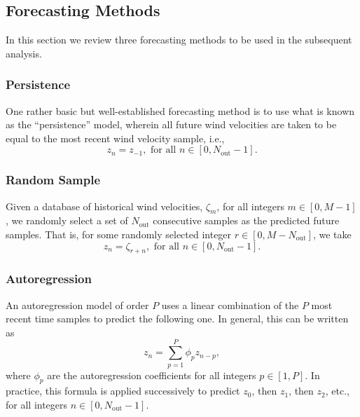 \documentclass[11pt, oneside]{article}
\begin{document}
\subsection{Forecasting Methods}\label{sec:Methods}
In this section we review three forecasting methods to be used in the subsequent analysis.

\subsubsection{Persistence}
One rather basic but well-established forecasting method is to use what is known as the ``persistence'' model, wherein all future wind velocities are taken to be equal to the most recent wind velocity sample, i.e.,
\begin{equation}
z_n = z_{-1}, \text{ for all } n \in [0, N_\text{out} - 1].
\end{equation}

\subsubsection{Random Sample}
Given a database of historical wind velocities, $\zeta_m$, for all integers $m \in [0, M-1]$, we randomly select a set of $N_\text{out}$ consecutive samples as the predicted future samples.
That is, for some randomly selected integer $r \in [0, M - N_\text{out}]$, we take
\begin{equation}
z_n = \zeta_{r+n}, \text{ for all } n \in [0, N_\text{out} - 1].
\end{equation}

\subsubsection{Autoregression}\label{sec:Methods:Autoregression}
An autoregression model of order $P$ uses a linear combination of the $P$ most recent time samples to predict the following one.
In general, this can be written as
\begin{equation}
z_n = \sum_{p = 1}^P \phi_p z_{n-p},
\end{equation}
where $\phi_p$ are the autoregression coefficients for all integers $p \in [1, P]$.
In practice, this formula is applied successively to predict $z_0$, then $z_1$, then $z_2$, etc., for all integers $n \in [0, N_\text{out} - 1]$.
\end{document}
